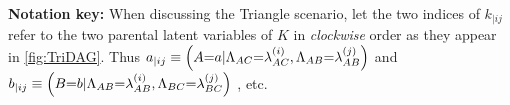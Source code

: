 \begin{EDITING...}
\textbf{Notation key:}  When discussing the Triangle scenario, let the two indices of $k_{|ij}$ refer to the two parental latent variables of $K$ in \emph{clockwise} order as they appear in \cref{fig:TriDAG}. Thus ${a_{|ij} \equiv \parens*{
A\cramp{=}a|\Lambda_{AC}\cramp{=}\lambda_{AC}^{(i)},\Lambda_{AB}\cramp{=}\lambda_{AB}^{(j)}}}$ and ${b_{|ij} \equiv \parens*{B\cramp{=}b|\Lambda_{AB}\cramp{=}\lambda_{AB}^{(i)},\Lambda_{BC}\cramp{=}\lambda_{BC}^{(j)}}}$ , etc.



\end{EDITING...}
